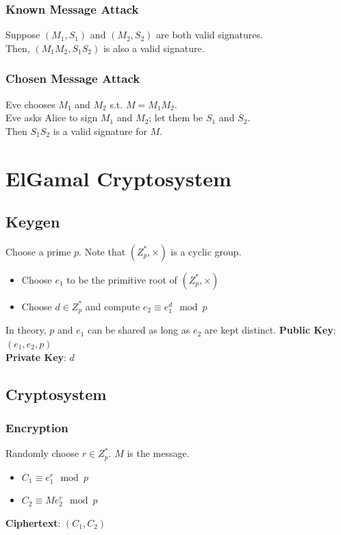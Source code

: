 \documentclass{report}
\begin{document}
			\subsubsection{Known Message Attack}
			Suppose $(M_1,S_1)$ and $(M_2,S_2)$ are both valid signatures.\\
			Then, $(M_1M_2,S_1S_2)$ is also a valid signature.
			
			\subsubsection{Chosen Message Attack}
			Eve chooses $M_1$ and $M_2$ s.t. $M=M_1M_2$.\\
			Eve asks Alice to sign $M_1$ and $M_2$; let them be $S_1$ and $S_2$.\\
			Then $S_1S_2$ is a valid signature for $M$.
		
	\section{ElGamal Cryptosystem}
		\subsection{Keygen}
			Choose a prime $p$. Note that $(Z_p^*,\times)$ is a cyclic group.
			\begin{itemize}
				\item Choose $e_1$ to be the primitive root of $(Z_p^*,\times)$
				\item Choose $d \in Z_p^*$ and compute $e_2 \equiv e_1^d \mod p$
			\end{itemize}
			In theory, $p$ and $e_1$ can be shared as long as $e_2$ are kept distinct.
			\textbf{Public Key}: $(e_1,e_2,p)$\\
			\textbf{Private Key}: $d$
		
		\subsection{Cryptosystem}
			\subsubsection{Encryption}
				Randomly choose $r \in Z_p^*$. $M$ is the message.
				\begin{itemize}
					\item $C_1 \equiv e_1^r \mod p$
					\item $C_2 \equiv Me_2^r \mod p$
				\end{itemize}
				\textbf{Ciphertext}: $(C_1,C_2)$
			
\end{document}
